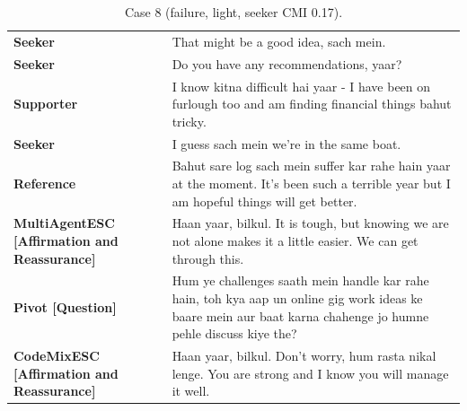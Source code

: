 \begin{table}[t]
\centering\footnotesize
\caption{Case 8 (failure, light, seeker CMI 0.17).}
\label{tab:case8}
\begin{tabular}{@{}p{}p{}@{}}
\toprule
\textbf{Seeker} & That might be a good idea, sach mein. \\
\textbf{Seeker} & Do you have any recommendations, yaar? \\
\textbf{Supporter} & I know kitna difficult hai yaar - I have been on furlough too and am finding financial things bahut tricky. \\
\textbf{Seeker} & I guess sach mein we're in the same boat. \\
\textbf{Reference} & Bahut sare log sach mein suffer kar rahe hain yaar at the moment. It's been such a terrible year but I am hopeful things will get better. \\
\textbf{MultiAgentESC [Affirmation and Reassurance]} & Haan yaar, bilkul. It is tough, but knowing we are not alone makes it a little easier. We can get through this. \\
\textbf{Pivot [Question]} & Hum ye challenges saath mein handle kar rahe hain, toh kya aap un online gig work ideas ke baare mein aur baat karna chahenge jo humne pehle discuss kiye the? \\
\textbf{CodeMixESC [Affirmation and Reassurance]} & Haan yaar, bilkul. Don't worry, hum rasta nikal lenge. You are strong and I know you will manage it well. \\
\bottomrule
\end{tabular}
\end{table}

